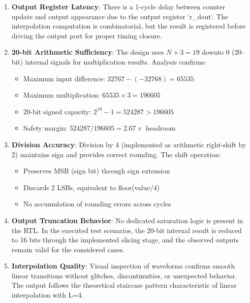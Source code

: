 \documentclass[a4paper,11pt]{article}
\begin{document}
\begin{enumerate}
    \item \textbf{Output Register Latency}: There is a 1-cycle delay between counter update and output appearance due to the output register `r\_dout`. The interpolation computation is combinatorial, but the result is registered before driving the output port for proper timing closure.
    
    \item \textbf{20-bit Arithmetic Sufficiency}: The design uses $N+3 = 19$ downto $0$ (20-bit) internal signals for multiplication results. Analysis confirms:
    \begin{itemize}
        \item Maximum input difference: $32767 - (-32768) = 65535$
        \item Maximum multiplication: $65535 \times 3 = 196605$
        \item 20-bit signed capacity: $2^{19} - 1 = 524287 > 196605$ 
        \item Safety margin: $524287 / 196605 = 2.67\times$ headroom
    \end{itemize}
    
    \item \textbf{Division Accuracy}: Division by 4 (implemented as arithmetic right-shift by 2) maintains sign and provides correct rounding. The shift operation:
    \begin{itemize}
        \item Preserves MSB (sign bit) through sign extension
        \item Discards 2 LSBs, equivalent to floor(value/4)
        \item No accumulation of rounding errors across cycles
    \end{itemize}
    
    \item \textbf{Output Truncation Behavior}: No dedicated saturation logic is present in the RTL. In the executed test scenarios, the 20-bit internal result is reduced to 16 bits through the implemented slicing stage, and the observed outputs remain valid for the considered cases.
    
    \item \textbf{Interpolation Quality}: Visual inspection of waveforms confirms smooth linear transitions without glitches, discontinuities, or unexpected behavior. The output follows the theoretical staircase pattern characteristic of linear interpolation with L=4.
\end{enumerate}
\end{document}
